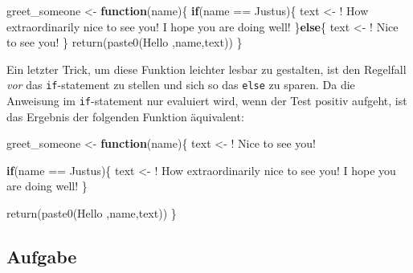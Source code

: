 \documentclass[
]{book}
\newenvironment{Shaded}{\begin{snugshade}}{\end{snugshade}}
\newcommand{\ControlFlowTok}[1]{\textcolor[rgb]{0.13,0.29,0.53}{\textbf{#1}}}
\newcommand{\FunctionTok}[1]{\textcolor[rgb]{0.00,0.00,0.00}{#1}}
\newcommand{\NormalTok}[1]{#1}
\newcommand{\OtherTok}[1]{\textcolor[rgb]{0.56,0.35,0.01}{#1}}
\newcommand{\SpecialCharTok}[1]{\textcolor[rgb]{0.00,0.00,0.00}{#1}}
\newcommand{\StringTok}[1]{\textcolor[rgb]{0.31,0.60,0.02}{#1}}
\begin{document}
\begin{Shaded}
\begin{Highlighting}[]
\NormalTok{greet\_someone }\OtherTok{\textless{}{-}} \ControlFlowTok{function}\NormalTok{(name)\{}
  \ControlFlowTok{if}\NormalTok{(name }\SpecialCharTok{==} \StringTok{\textquotesingle{}Justus\textquotesingle{}}\NormalTok{)\{}
\NormalTok{    text }\OtherTok{\textless{}{-}} \StringTok{\textquotesingle{}! How extraordinarily nice to see you! I hope you are doing well!\textquotesingle{}}
\NormalTok{  \}}\ControlFlowTok{else}\NormalTok{\{}
\NormalTok{    text }\OtherTok{\textless{}{-}} \StringTok{\textquotesingle{}! Nice to see you!\textquotesingle{}}
\NormalTok{  \}}
  \FunctionTok{return}\NormalTok{(}\FunctionTok{paste0}\NormalTok{(}\StringTok{\textquotesingle{}Hello \textquotesingle{}}\NormalTok{,name,text))}
\NormalTok{\}}
\end{Highlighting}
\end{Shaded}

Ein letzter Trick, um diese Funktion leichter lesbar zu gestalten, ist den Regelfall \emph{vor} das \texttt{if}-statement zu stellen und sich so das \texttt{else} zu sparen. Da die Anweisung im \texttt{if}-statement nur evaluiert wird, wenn der Test positiv aufgeht, ist das Ergebnis der folgenden Funktion äquivalent:

\begin{Shaded}
\begin{Highlighting}[]
\NormalTok{greet\_someone }\OtherTok{\textless{}{-}} \ControlFlowTok{function}\NormalTok{(name)\{}
\NormalTok{  text }\OtherTok{\textless{}{-}} \StringTok{\textquotesingle{}! Nice to see you!\textquotesingle{}}
  
  \ControlFlowTok{if}\NormalTok{(name }\SpecialCharTok{==} \StringTok{\textquotesingle{}Justus\textquotesingle{}}\NormalTok{)\{}
\NormalTok{    text }\OtherTok{\textless{}{-}} \StringTok{\textquotesingle{}! How extraordinarily nice to see you! I hope you are doing well!\textquotesingle{}}
\NormalTok{  \}}
  
  \FunctionTok{return}\NormalTok{(}\FunctionTok{paste0}\NormalTok{(}\StringTok{\textquotesingle{}Hello \textquotesingle{}}\NormalTok{,name,text))}
\NormalTok{\}}
\end{Highlighting}
\end{Shaded}

\hypertarget{aufgabe-2}{%
\subsection{Aufgabe}\label{aufgabe-2}}
\end{document}
